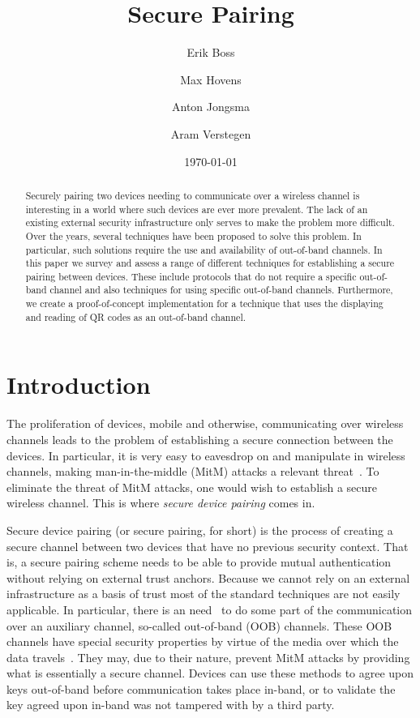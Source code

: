 \documentclass[conference, 11pt]{sty/IEEEtran}
\title{Secure Pairing}
\author{Erik Boss \and Max Hovens \and Anton Jongsma \and Aram Verstegen}
\date{\today}
\begin{document}
\maketitle

\begin{abstract}

Securely pairing two devices needing to communicate over a wireless channel is interesting in a world where such devices are ever more prevalent.
The lack of an existing external security infrastructure only serves to make the problem more difficult.
Over the years, several techniques have been proposed to solve this problem.
In particular, such solutions require the use and availability of out-of-band channels.
In this paper we survey and assess a range of different techniques for establishing a secure pairing between devices.
These include protocols that do not require a specific out-of-band channel and also techniques for using specific out-of-band channels.
Furthermore, we create a proof-of-concept implementation for a technique that uses the displaying and reading of QR codes as an out-of-band channel.

\end{abstract}

\section{Introduction}
\label{sec:introduction}

The proliferation of devices, mobile and otherwise, communicating over wireless channels leads to the problem of establishing a secure connection between the devices.
In particular, it is very easy to eavesdrop on and manipulate in wireless channels, making man-in-the-middle (MitM) attacks a relevant threat~\cite{kumar2009comparative}.
To eliminate the threat of MitM attacks, one would wish to establish a secure wireless channel.
This is where \emph{secure device pairing} comes in.

Secure device pairing (or secure pairing, for short) is the process of creating a secure channel between two devices that have no previous security context.
That is, a secure pairing scheme needs to be able to provide mutual authentication without relying on external trust anchors.
Because we cannot rely on an external infrastructure as a basis of trust most of the standard techniques are not easily applicable.
In particular, there is an need~\cite{kumar2009comparative} to do some part of the communication over an auxiliary channel, so-called out-of-band (OOB) channels.
These OOB channels have special security properties by virtue of the media over which the data travels~\cite{balfanz2002talking}.
They may, due to their nature, prevent MitM attacks by providing what is essentially a secure channel.
Devices can use these methods to agree upon keys out-of-band before communication takes place in-band, or to validate the key agreed upon in-band was not tampered with by a third party.
\end{document}
